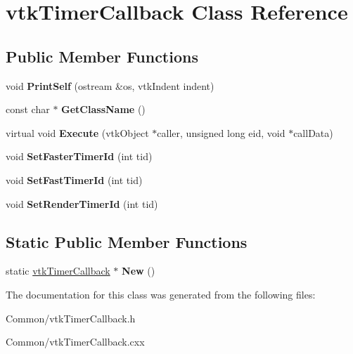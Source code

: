 \hypertarget{classvtkTimerCallback}{
\section{vtkTimerCallback Class Reference}
\label{classvtkTimerCallback}
}
\subsection*{Public Member Functions}
\begin{DoxyCompactItemize}
\item 
\hypertarget{classvtkTimerCallback_a167d7bd36111dda264b55e684555722b}{
void {\bfseries PrintSelf} (ostream \&os, vtkIndent indent)}
\label{classvtkTimerCallback_a167d7bd36111dda264b55e684555722b}

\item 
\hypertarget{classvtkTimerCallback_a324a5f36b9a83e26103d03512a6e913f}{
const char $\ast$ {\bfseries GetClassName} ()}
\label{classvtkTimerCallback_a324a5f36b9a83e26103d03512a6e913f}

\item 
\hypertarget{classvtkTimerCallback_a2b3ea5de075b4b8dfee686b4366edbcf}{
virtual void {\bfseries Execute} (vtkObject $\ast$caller, unsigned long eid, void $\ast$callData)}
\label{classvtkTimerCallback_a2b3ea5de075b4b8dfee686b4366edbcf}

\item 
\hypertarget{classvtkTimerCallback_ac32082c072bb5380ab52653da88f0584}{
void {\bfseries SetFasterTimerId} (int tid)}
\label{classvtkTimerCallback_ac32082c072bb5380ab52653da88f0584}

\item 
\hypertarget{classvtkTimerCallback_ae1879c0c2c7fc905e83ccee907a28be5}{
void {\bfseries SetFastTimerId} (int tid)}
\label{classvtkTimerCallback_ae1879c0c2c7fc905e83ccee907a28be5}

\item 
\hypertarget{classvtkTimerCallback_afa474e8e77e3263ae2c30e374a1d44db}{
void {\bfseries SetRenderTimerId} (int tid)}
\label{classvtkTimerCallback_afa474e8e77e3263ae2c30e374a1d44db}

\end{DoxyCompactItemize}
\subsection*{Static Public Member Functions}
\begin{DoxyCompactItemize}
\item 
\hypertarget{classvtkTimerCallback_a4572f47b26487049caa8e90aba3750c1}{
static \hyperlink{classvtkTimerCallback}{vtkTimerCallback} $\ast$ {\bfseries New} ()}
\label{classvtkTimerCallback_a4572f47b26487049caa8e90aba3750c1}

\end{DoxyCompactItemize}


The documentation for this class was generated from the following files:\begin{DoxyCompactItemize}
\item 
Common/vtkTimerCallback.h\item 
Common/vtkTimerCallback.cxx\end{DoxyCompactItemize}
